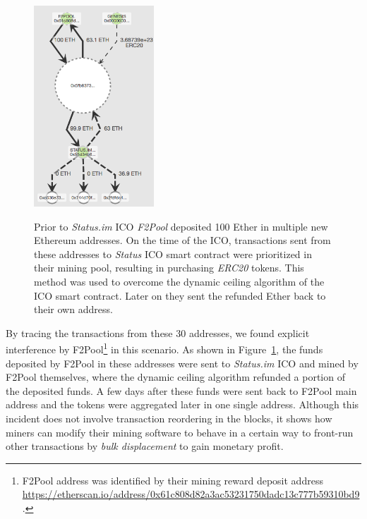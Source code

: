 \begin{figure}[h!]
    \centering
{\caption[Status.im funds flow visualization]{Prior to \textit{Status.im} ICO  \textit{F2Pool} deposited 100 Ether in multiple new Ethereum addresses. On the time of the ICO, transactions sent from these addresses to \textit{Status} ICO smart contract were prioritized in their mining pool, resulting in purchasing \textit{ERC20} tokens. This method was used to overcome the dynamic ceiling algorithm of the ICO smart contract. Later on they sent the refunded Ether back to their own address.\protect\footnotemark \label{fig:f2poolfront-run}}}
{\includegraphics[width=0.4\textwidth]{figures/F2Pool_transactions_to_StatusICO_and_Refunds.png}}
\end{figure}


By tracing the transactions from these 30 addresses, we found explicit interference by F2Pool\footnote{F2Pool address was identified by their mining reward deposit address \url{https://etherscan.io/address/0x61c808d82a3ac53231750dadc13c777b59310bd9}.} in this scenario. As shown in Figure~\ref{fig:f2poolfront-run}, the funds deposited by F2Pool in these addresses were sent to \textit{Status.im} ICO and mined by F2Pool themselves, where the dynamic ceiling algorithm refunded a portion of the deposited funds. A few days after these funds were sent back to F2Pool main address and the tokens were aggregated later in one single address. Although this incident does not involve transaction reordering in the blocks, it shows how miners can modify their mining software to behave in a certain way to front-run other transactions by \textit{bulk displacement} to gain monetary profit.


